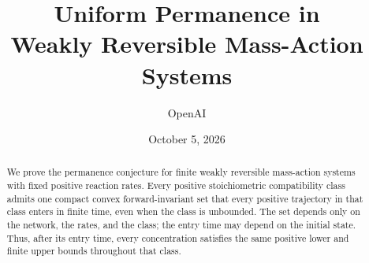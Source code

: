 \documentclass[11pt]{article}
\title{Uniform Permanence in\\Weakly Reversible Mass-Action Systems}
\author{OpenAI}
\date{October 5, 2026}
\theoremstyle{definition}
\theoremstyle{remark}
\numberwithin{equation}{section}
\begin{document}
\maketitle
\begin{abstract}
We prove the permanence conjecture for finite weakly reversible mass-action
systems with fixed positive reaction rates. Every positive stoichiometric
compatibility class admits one compact convex forward-invariant set that
every positive trajectory in that class enters in finite time, even when
the class is unbounded. The set depends only on the network, the rates, and
the class; the entry time may depend on the initial state. Thus, after its
entry time, every concentration satisfies the same positive lower and
finite upper bounds throughout that class.
\end{abstract}





\begingroup
\small

\endgroup
\end{document}

